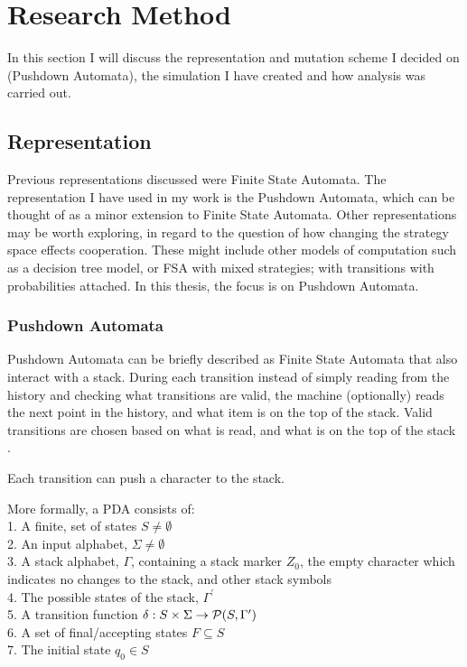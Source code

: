 \documentclass[a4paper,11pt,bcshonoursthesis,singlespace,twoside,thesisdraft,pdflatex]{cssethesis}
\begin{document}
\chapter{Research Method}
In this section I will discuss the representation and mutation scheme I decided on (Pushdown Automata), the simulation I have created and how analysis was carried out.
\section{Representation}
Previous representations discussed were Finite State Automata. The representation I have used in my work is the Pushdown Automata, which can be thought of as a minor extension to Finite State Automata. 
Other representations may be worth exploring, in regard to the question of how changing the strategy space effects cooperation. These might include other models of computation such as a decision tree model, or FSA with mixed strategies; with transitions with probabilities attached. 
In this thesis, the focus is on Pushdown Automata. 
\subsection{Pushdown Automata}
Pushdown Automata can be briefly described as Finite State Automata that also interact with a stack. During each transition instead of simply reading from the history and checking what transitions are valid, the machine (optionally) reads the next point in the history, and what item is on the top of the stack. 
Valid transitions are chosen based on what is read, and what is on the top of the stack \citep{Sipser2006chap2}. 

Each transition can push a character to the stack. 

More formally, a PDA consists of:\\
1. A finite, set of states $S \neq  \emptyset$\\
2. An input alphabet, $\Sigma \neq  \emptyset$\\
3. A stack alphabet, $\Gamma$, containing a stack marker $Z_0$, the empty character which indicates no changes to the stack, and other stack symbols\\
4. The possible states of the stack, $\Gamma^\prime$\\
5. A transition function $\delta : S \times \Sigma \time \Gamma \rightarrow \mathcal P(S,\Gamma^\prime)$\\
6. A set of final/accepting states $F \subseteq S$ \\
7. The initial state $q_0 \in S$\\
\end{document}
